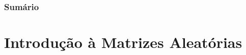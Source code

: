 




\frame{\titlepage}

{
\begin{frame}
\frametitle{Sumário}
\tableofcontents
\end{frame}
}


\section{Introdução à Matrizes Aleatórias}

